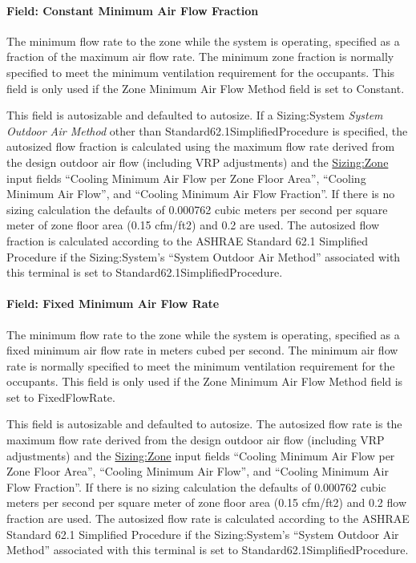 \paragraph{Field: Constant Minimum Air Flow Fraction}\label{field-constant-minimum-air-flow-fraction-1}

The minimum flow rate to the zone while the system is operating, specified as a fraction of the maximum air flow rate. The minimum zone fraction is normally specified to meet the minimum ventilation requirement for the occupants. This field is only used if the Zone Minimum Air Flow Method field is set to Constant.

This field is autosizable and defaulted to autosize. If a Sizing:System \emph{System Outdoor Air Method} other than Standard62.1SimplifiedProcedure is specified, the autosized flow fraction is calculated using the maximum flow rate derived from the design outdoor air flow (including VRP adjustments) and the \hyperref[sizingzone]{Sizing:Zone} input fields ``Cooling Minimum Air Flow per Zone Floor Area'', ``Cooling Minimum Air Flow'', and ``Cooling Minimum Air Flow Fraction''. If there is no sizing calculation the defaults of 0.000762 cubic meters per second per square meter of zone floor area (0.15 cfm/ft2) and 0.2 are used. The autosized flow fraction is calculated according to the ASHRAE Standard 62.1 Simplified Procedure if the Sizing:System's ``System Outdoor Air Method'' associated with this terminal is set to Standard62.1SimplifiedProcedure.

\paragraph{Field: Fixed Minimum Air Flow Rate}\label{field-fixed-minimum-air-flow-rate-1}

The minimum flow rate to the zone while the system is operating, specified as a fixed minimum air flow rate in meters cubed per second. The minimum air flow rate is normally specified to meet the minimum ventilation requirement for the occupants. This field is only used if the Zone Minimum Air Flow Method field is set to FixedFlowRate.

This field is autosizable and defaulted to autosize. The autosized flow rate is the maximum flow rate derived from the design outdoor air flow (including VRP adjustments) and the \hyperref[sizingzone]{Sizing:Zone} input fields ``Cooling Minimum Air Flow per Zone Floor Area'', ``Cooling Minimum Air Flow'', and ``Cooling Minimum Air Flow Fraction''. If there is no sizing calculation the defaults of 0.000762 cubic meters per second per square meter of zone floor area (0.15 cfm/ft2) and 0.2 flow fraction are used. The autosized flow rate is calculated according to the ASHRAE Standard 62.1 Simplified Procedure if the Sizing:System's ``System Outdoor Air Method'' associated with this terminal is set to Standard62.1SimplifiedProcedure.

